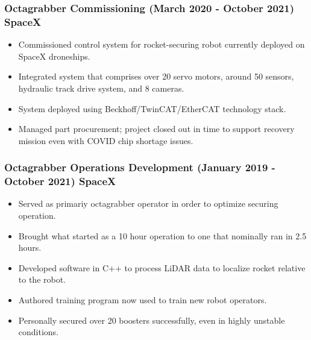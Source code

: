 \documentclass[11pt]{article}
\begin{document}
    \subsubsection*{Octagrabber Commissioning
                    (March 2020 - October 2021) \hfill SpaceX}
		\begin{itemize}
		    \setlength\itemsep{-0.5em}
		    \item Commissioned control system for rocket-securing robot
		          currently deployed on SpaceX droneships.
            \item Integrated system that comprises over 20 servo motors, 
                  around 50 sensors, hydraulic track drive system, and
                  8 cameras.
            \item System deployed using Beckhoff/TwinCAT/EtherCAT technology
                  stack.
		    \item Managed part procurement; project closed out in time to 
		          support recovery mission even with COVID chip shortage 
		          issues.
		    
		\end{itemize}
	
	\subsubsection*{Octagrabber Operations Development 
	                (January 2019 - October 2021) \hfill SpaceX}
        \begin{itemize}
            \setlength\itemsep{-0.5em}
            \item Served as primariy octagrabber operator in order to 
                  optimize securing operation. 
            \item Brought what started as a 
                  10 hour operation to one that nominally ran in 2.5 hours.
            \item Developed software in C++ to process LiDAR data to localize 
                  rocket relative to the robot.
            \item Authored training program now used to train new robot
                  operators.
            \item Personally secured over 20 boosters successfully,
                  even in highly unstable conditions.
        \end{itemize}
\end{document}
